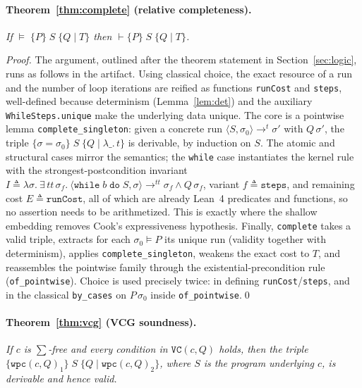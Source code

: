 \documentclass[runningheads]{llncs}
\newcommand{\Lean}{Lean~4\xspace}
\newcommand{\State}{\sigma}
\newcommand{\evals}[4]{\langle #1, #2\rangle \rightarrow^{#3} #4}
\newcommand{\triple}[4]{\{#1\}\;#2\;\{#3 \mid #4\}}
\newcommand{\Valid}{\vDash}
\newcommand{\code}[1]{\texttt{#1}}
\begin{document}
\paragraph{Theorem~\ref{thm:complete} (relative completeness).}
\emph{If $\Valid\;\triple{P}{S}{Q}{T}$ then $\vdash \triple{P}{S}{Q}{T}$.}

\begin{proof}
The argument, outlined after the theorem statement in Section~\ref{sec:logic},
runs as follows in the artifact. Using classical choice, the exact resource of a
run and the number of loop iterations are reified as functions \code{runCost} and
\code{steps}, well-defined because determinism (Lemma~\ref{lem:det}) and the
auxiliary \code{WhileSteps.unique} make the underlying data unique. The core is a
pointwise lemma \code{complete\_singleton}: given a concrete run
$\evals{S}{\State_0}{t}{\State'}$ with $Q\,\State'$, the triple
$\triple{\State = \State_0}{S}{Q}{\lambda\_.\,t}$ is derivable, by induction on
$S$. The atomic and structural cases mirror the semantics; the \code{while} case
instantiates the kernel rule with the strongest-postcondition invariant
$I \triangleq \lambda\State.\ \exists\,tt\,\State_f.\
\evals{\code{while}\;b\;\code{do}\;S}{\State}{tt}{\State_f} \wedge Q\,\State_f$,
variant $f \triangleq \code{steps}$, and remaining cost $E \triangleq \code{runCost}$,
all of which are already \Lean{} predicates and functions, so no assertion needs to
be arithmetized. This is exactly where the shallow embedding removes Cook's
expressiveness hypothesis. Finally, \code{complete} takes a valid triple, extracts
for each $\State_0 \vDash P$ its unique run (validity together with determinism),
applies \code{complete\_singleton}, weakens the exact cost to $T$, and reassembles
the pointwise family through the existential-precondition rule
(\code{of\_pointwise}). Choice is used precisely twice: in defining
\code{runCost}/\code{steps}, and in the classical \code{by\_cases} on
$P\,\State_0$ inside \code{of\_pointwise}.\qed
\end{proof}

\paragraph{Theorem~\ref{thm:vcg} (VCG soundness).}
\emph{If $c$ is $\sum$-free and every condition in $\code{VC}(c, Q)$ holds, then
the triple $\triple{\code{wpc}(c,Q)_1}{S}{Q}{\code{wpc}(c,Q)_2}$, where $S$ is the
program underlying $c$, is derivable and hence valid.}
\end{document}
